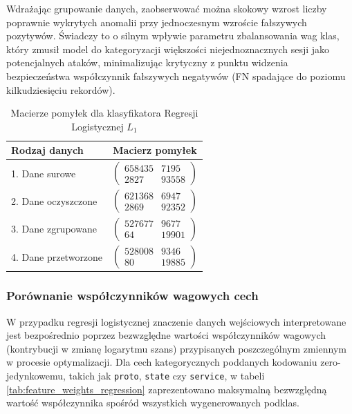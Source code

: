 \documentclass[12pt,twoside]{article}
\begin{document}
Wdrażając grupowanie danych, zaobserwować można skokowy wzrost liczby poprawnie wykrytych anomalii przy jednoczesnym wzroście fałszywych pozytywów. 
Świadczy to o silnym wpływie parametru zbalansowania wag klas, który zmusił model do kategoryzacji większości niejednoznacznych sesji jako potencjalnych ataków, minimalizując krytyczny z punktu widzenia bezpieczeństwa współczynnik fałszywych negatywów (FN spadające do poziomu kilkudziesięciu rekordów).

\begin{table}[ht]
\caption{Macierze pomyłek dla klasyfikatora Regresji Logistycznej $L_1$}
\centering
\renewcommand{\arraystretch}{1.3}
\begin{tabular}{|l|c|}
\hline
\textbf{Rodzaj danych} & \textbf{Macierz pomyłek} \\
\hline
1. Dane surowe & $\begin{pmatrix} 658435 & 7195 \\ 2827 & 93558 \end{pmatrix}$ \\
\hline
2. Dane oczyszczone & $\begin{pmatrix} 621368 & 6947 \\ 2869 & 92352 \end{pmatrix}$ \\
\hline
3. Dane zgrupowane & $\begin{pmatrix} 527677 & 9677 \\ 64 & 19901 \end{pmatrix}$ \\
\hline
4. Dane przetworzone & $\begin{pmatrix} 528008 & 9346 \\ 80 & 19885 \end{pmatrix}$ \\
\hline
\end{tabular}
\label{tab:cm_logistic_regression}
\end{table}

\subsubsection{Porównanie współczynników wagowych cech}

W przypadku regresji logistycznej znaczenie danych wejściowych interpretowane jest bezpośrednio poprzez bezwzględne wartości współczynników wagowych (kontrybucji w zmianę logarytmu szans) przypisanych poszczególnym zmiennym w procesie optymalizacji. 
Dla cech kategorycznych poddanych kodowaniu zero-jedynkowemu, takich jak \texttt{proto}, \texttt{state} czy \texttt{service}, w tabeli \ref{tab:feature_weights_regression} zaprezentowano maksymalną bezwzględną wartość współczynnika spośród wszystkich wygenerowanych podklas.
\end{document}
